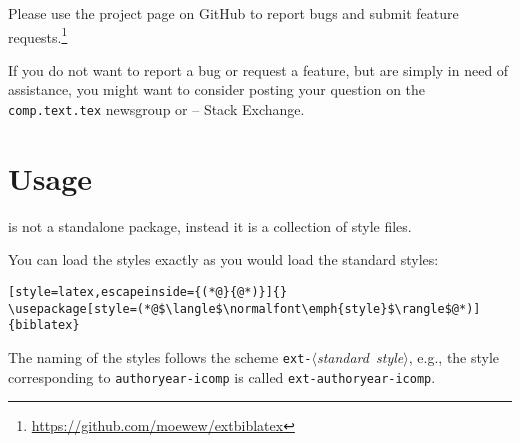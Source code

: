 \documentclass{ltxdockit}
\newcommand*{\gitbaseurl}{https://github.com/moewew/extbiblatex}
\begin{document}
Please use the  project page on GitHub to report bugs and
submit feature requests.\footnote{\url{\gitbaseurl}}

If you do not want to report a bug or request a feature, but are simply in need
of assistance, you might want to consider posting your question on the
\texttt{comp.text.tex} newsgroup or \tex{} -- \latex Stack Exchange.%

\section{Usage}

 is not a standalone package, instead it is a collection of
 style files.

You can load the styles exactly as you would load the standard styles:
\begin{lstlisting}[style=latex,escapeinside={(*@}{@*)}]{}
\usepackage[style=(*@$\langle$\normalfont\emph{style}$\rangle$@*)]{biblatex}
\end{lstlisting}

The naming of the styles follows the scheme
\mbox{\texttt{ext-}$\langle$\emph{standard style}$\rangle$}, e.g.,
the style corresponding to \texttt{authoryear-icomp} is called
\texttt{ext-authoryear-icomp}.
\end{document}
